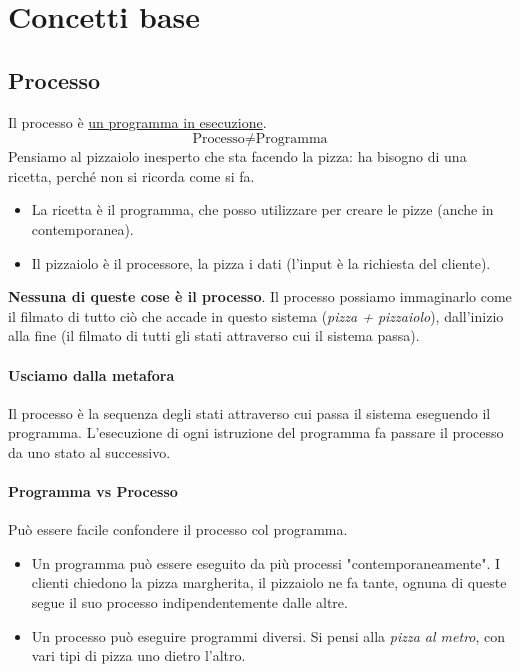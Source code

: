 \documentclass[11pt]{report}
\theoremstyle{definition}
\begin{document}
\section{Concetti base}
\subsection{Processo} Il processo è \underline{un programma in esecuzione}. 
\[\text{Processo} \neq \text{Programma}\]
Pensiamo al pizzaiolo inesperto che sta facendo la pizza: ha bisogno di una ricetta, perché non si ricorda come si fa.
\begin{itemize}
\item La ricetta è il programma, che posso utilizzare per creare le pizze (anche in contemporanea).
\item Il pizzaiolo è il processore, la pizza i dati (l'input è la richiesta del cliente).
\end{itemize}
\textbf{Nessuna di queste cose è il processo}. Il processo possiamo immaginarlo come il filmato di tutto ciò che accade in questo sistema (\emph{pizza + pizzaiolo}), dall'inizio alla fine (il filmato di tutti gli stati attraverso cui il sistema passa).
\paragraph{Usciamo dalla metafora} Il processo è la sequenza degli stati attraverso cui passa il sistema eseguendo il programma. L'esecuzione di ogni istruzione del programma fa passare il processo da uno stato al successivo.
\paragraph{Programma vs Processo} Può essere facile confondere il processo col programma.
\begin{itemize}
	\item Un programma può essere eseguito da più processi "contemporaneamente". I clienti chiedono la pizza margherita, il pizzaiolo ne fa tante, ognuna di queste segue il suo processo indipendentemente dalle altre. 
	\item Un processo può eseguire programmi diversi. Si pensi alla \emph{pizza al metro}, con vari tipi di pizza uno dietro l'altro.
\end{itemize}
\end{document}
